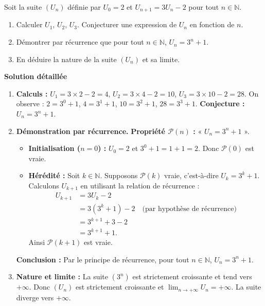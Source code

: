 \documentclass[11pt]{article}
\begin{document}
\begin{exoresolu}
    Soit la suite $(U_n)$ définie par $U_0 = 2$ et $U_{n+1} = 3U_n - 2$ pour tout $n \in \mathbb{N}$.
    \begin{enumerate}
        \item Calculer $U_1$, $U_2$, $U_3$. Conjecturer une expression de $U_n$ en fonction de $n$.
        \item Démontrer par récurrence que pour tout $n \in \mathbb{N}$, $U_n = 3^n + 1$.
        \item En déduire la nature de la suite $(U_n)$ et sa limite.
    \end{enumerate}
    \tcblower
    \textbf{Solution détaillée}
    \begin{enumerate}
        \item \textbf{Calculs :}
        $U_1 = 3 \times 2 - 2 = 4$,
        $U_2 = 3 \times 4 - 2 = 10$,
        $U_3 = 3 \times 10 - 2 = 28$.
        On observe : $2 = 3^0+1$, $4=3^1+1$, $10=3^2+1$, $28=3^3+1$.
        \textbf{Conjecture :} $U_n = 3^n + 1$.
        \item \textbf{Démonstration par récurrence.}
        \textbf{Propriété $\mathcal{P}(n)$ :} « $U_n = 3^n + 1$ ».
        \begin{itemize}
            \item \textbf{Initialisation ($n=0$) :} $U_0 = 2$ et $3^0 + 1 = 1 + 1 = 2$. Donc $\mathcal{P}(0)$ est vraie.
            \item \textbf{Hérédité :} Soit $k \in \mathbb{N}$. Supposons $\mathcal{P}(k)$ vraie, c'est-à-dire $U_k = 3^k + 1$.
            Calculons $U_{k+1}$ en utilisant la relation de récurrence :
            \begin{align*}
                U_{k+1} &= 3U_k - 2 \\
                &= 3(3^k + 1) - 2 \quad \text{(par hypothèse de récurrence)} \\
                &= 3^{k+1} + 3 - 2 \\
                &= 3^{k+1} + 1.
            \end{align*}
            Ainsi $\mathcal{P}(k+1)$ est vraie.
        \end{itemize}
        \textbf{Conclusion :} Par le principe de récurrence, pour tout $n \in \mathbb{N}$, $U_n = 3^n + 1$.
        \item \textbf{Nature et limite :}
        La suite $(3^n)$ est strictement croissante et tend vers $+\infty$.
        Donc $(U_n)$ est strictement croissante et $\lim_{n\to+\infty} U_n = +\infty$.
        La suite diverge vers $+\infty$.
    \end{enumerate}
\end{exoresolu}
\end{document}
